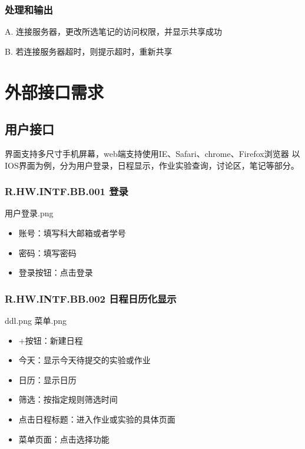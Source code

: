     \subsubsection{处理和输出}
	A. 连接服务器，更改所选笔记的访问权限，并显示共享成功

	B. 若连接服务器超时，则提示超时，重新共享

\section{外部接口需求}
  \subsection{用户接口}
  界面支持多尺寸手机屏幕，web端支持使用IE、Safari、chrome、Firefox浏览器
以IOS界面为例，分为用户登录，日程显示，作业实验查询，讨论区，笔记等部分。
    \subsubsection{R.HW.INTF.BB.001 登录}
    用户登录.png
    \begin{itemize}
  \item 账号：填写科大邮箱或者学号
  \item 密码：填写密码
  \item 登录按钮：点击登录
  \end{itemize}
    \subsubsection{R.HW.INTF.BB.002 日程日历化显示}
    ddl.png
    菜单.png
    \begin{itemize}
  \item +按钮：新建日程
  \item 今天：显示今天待提交的实验或作业
  \item 日历：显示日历
  \item 筛选：按指定规则筛选时间
  \item 点击日程标题：进入作业或实验的具体页面
  \item 菜单页面：点击选择功能
  \end{itemize}
